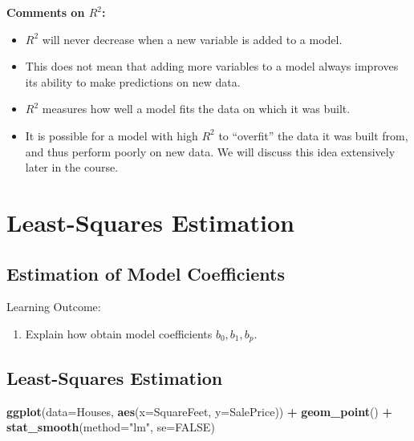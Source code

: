 \documentclass[]{book}
\newenvironment{Shaded}{\begin{snugshade}}{\end{snugshade}}
\newcommand{\KeywordTok}[1]{\textcolor[rgb]{0.13,0.29,0.53}{\textbf{#1}}}
\newcommand{\DataTypeTok}[1]{\textcolor[rgb]{0.13,0.29,0.53}{#1}}
\newcommand{\StringTok}[1]{\textcolor[rgb]{0.31,0.60,0.02}{#1}}
\newcommand{\OtherTok}[1]{\textcolor[rgb]{0.56,0.35,0.01}{#1}}
\newcommand{\OperatorTok}[1]{\textcolor[rgb]{0.81,0.36,0.00}{\textbf{#1}}}
\newcommand{\NormalTok}[1]{#1}
\providecommand{\tightlist}{%
  \setlength{\itemsep}{0pt}\setlength{\parskip}{0pt}}
\begin{document}
\textbf{Comments on \(R^2\):}

\begin{itemize}
\tightlist
\item
  \(R^2\) will never decrease when a new variable is added to a model.\\
\item
  This does not mean that adding more variables to a model always
  improves its ability to make predictions on new data.\\
\item
  \(R^2\) measures how well a model fits the data on which it was
  built.\\
\item
  It is possible for a model with high \(R^2\) to ``overfit'' the data
  it was built from, and thus perform poorly on new data. We will
  discuss this idea extensively later in the course.
\end{itemize}

\section{Least-Squares Estimation}\label{least-squares-estimation}

\subsection{Estimation of Model
Coefficients}\label{estimation-of-model-coefficients}

Learning Outcome:

\begin{enumerate}
\def\labelenumi{\arabic{enumi}.}
\tightlist
\item
  Explain how obtain model coefficients \(b_0, b_1, b_p\).
\end{enumerate}

\subsection{Least-Squares Estimation}\label{least-squares-estimation-1}

\begin{Shaded}
\begin{Highlighting}[]
\KeywordTok{ggplot}\NormalTok{(}\DataTypeTok{data=}\NormalTok{Houses, }\KeywordTok{aes}\NormalTok{(}\DataTypeTok{x=}\NormalTok{SquareFeet, }\DataTypeTok{y=}\NormalTok{SalePrice)) }\OperatorTok{+}\StringTok{ }\KeywordTok{geom_point}\NormalTok{() }\OperatorTok{+}\StringTok{ }
\StringTok{  }\KeywordTok{stat_smooth}\NormalTok{(}\DataTypeTok{method=}\StringTok{"lm"}\NormalTok{, }\DataTypeTok{se=}\OtherTok{FALSE}\NormalTok{)}
\end{Highlighting}
\end{Shaded}
\end{document}

